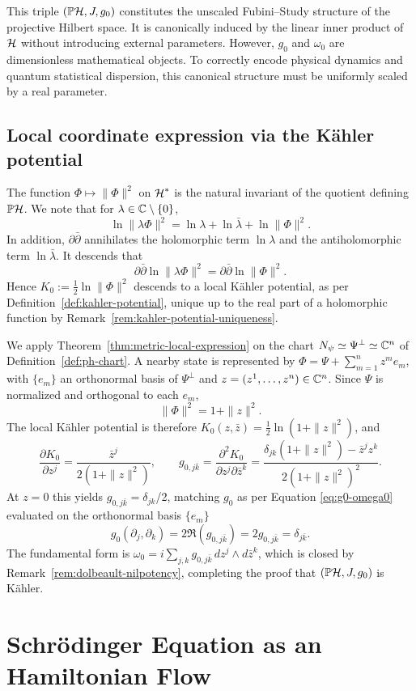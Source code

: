 \noindent This triple $(\PH, J, g_0)$ constitutes the unscaled Fubini--Study structure of the projective Hilbert space. It is canonically induced by the linear inner product of $\H$ without introducing external parameters. However, $g_0$ and $\omega_0$ are dimensionless mathematical objects. To correctly encode physical dynamics and quantum statistical dispersion, this canonical structure must be uniformly scaled by a real parameter.

\subsection*{Local coordinate expression via the Kähler potential}

The function $\Phi\mapsto\|\Phi\|^2$ on $\H^*$ is the natural invariant
of the quotient defining $\PH$. We note that for $\lambda\in\mathbb{C}\setminus\{0\}$,
\[
\ln\|\lambda\Phi\|^2=\ln\lambda+\ln\bar\lambda+\ln\|\Phi\|^2.
\] 
In addition, $\partial\bar\partial$ annihilates the holomorphic term
$\ln\lambda$ and the antiholomorphic term $\ln\bar\lambda$. It descends that $$\partial\bar\partial\ln\|\lambda\Phi\|^2=\partial\bar\partial\ln\|\Phi\|^2.$$
Hence $K_0:=\frac{1}{2}\ln\|\Phi\|^2$ descends to a local Kähler potential, as per
Definition~\ref{def:kahler-potential}, unique up to the real part of a
holomorphic function by Remark~\ref{rem:kahler-potential-uniqueness}.

We apply Theorem~\ref{thm:metric-local-expression} on the chart
$N_\psi\simeq\Psi^\perp\simeq\mathbb{C}^n$ of Definition~\ref{def:ph-chart}. A
nearby state is represented by $\Phi=\Psi+\sum_{m=1}^nz^me_m$, with
$\{e_m\}$ an orthonormal basis of $\Psi^\perp$ and
$z=(z^1,\dots,z^n)\in\mathbb{C}^n$. Since $\Psi$ is normalized and orthogonal
to each $e_m$,
\[
\|\Phi\|^2=1+\|z\|^2.
\]
The local Kähler potential is therefore $K_0(z,\bar z)=\frac{1}{2}\ln(1+\|z\|^2)$,
and
\[
\frac{\partial K_0}{\partial z^j}=\frac{\bar z^j}{2(1+\|z\|^2)}, \qquad
g_{0,j\bar k}=\frac{\partial^2K_0}{\partial z^j\partial\bar z^k}=\frac{\delta_{jk}(1+\|z\|^2)-\bar z^jz^k}{2(1+\|z\|^2)^2}.
\]
At $z=0$ this yields $g_{0,j\bar k}=\delta_{jk}$/2, matching $g_0$ as per Equation \eqref{eq:g0-omega0} evaluated on the orthonormal basis $\{e_m\}$
$$g_0(\partial_j, \partial_k) = 2 \Re{(g_{0,j \bar{k}})} = 2g_{0,j \bar{k}} = \delta_{j \bar{k}}.$$
The fundamental form is $\omega_0=i\sum_{j,k}g_{0,j\bar k}\,dz^j\wedge
d\bar z^k$, which is closed by Remark~\ref{rem:dolbeault-nilpotency},
completing the proof that $(\PH,J,g_0)$ is Kähler.

\section{Schrödinger Equation as an Hamiltonian Flow}
\label{sec:dynamics}

